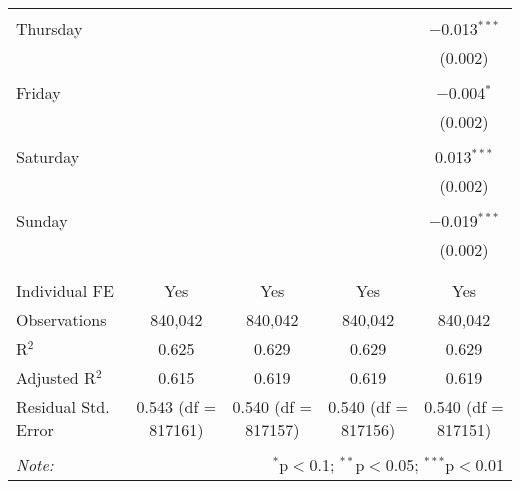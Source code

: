 \documentclass[
]{article}
\begin{document}
\begin{table}[!htbp]
{\begin{tabular}{@{\extracolsep{5pt}}lcccc}
  & & & & \\ 
 Thursday &  &  &  & $-$0.013$^{***}$ \\ 
  &  &  &  & (0.002) \\ 
  & & & & \\ 
 Friday &  &  &  & $-$0.004$^{*}$ \\ 
  &  &  &  & (0.002) \\ 
  & & & & \\ 
 Saturday &  &  &  & 0.013$^{***}$ \\ 
  &  &  &  & (0.002) \\ 
  & & & & \\ 
 Sunday &  &  &  & $-$0.019$^{***}$ \\ 
  &  &  &  & (0.002) \\ 
  & & & & \\ 
\hline \\[-1.8ex] 
Individual FE & Yes & Yes & Yes & Yes \\ 
Observations & 840,042 & 840,042 & 840,042 & 840,042 \\ 
R$^{2}$ & 0.625 & 0.629 & 0.629 & 0.629 \\ 
Adjusted R$^{2}$ & 0.615 & 0.619 & 0.619 & 0.619 \\ 
Residual Std. Error & 0.543 (df = 817161) & 0.540 (df = 817157) & 0.540 (df = 817156) & 0.540 (df = 817151) \\ 
\hline 
\hline \\[-1.8ex] 
\textit{Note:}  & \multicolumn{4}{r}{$^{*}$p$<$0.1; $^{**}$p$<$0.05; $^{***}$p$<$0.01} \\ 
\end{tabular}
} 
\end{table} 
\newpage
\end{document}
